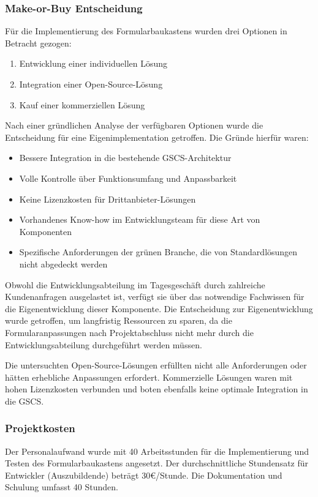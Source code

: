 \documentclass[a4paper,11pt]{article}
\begin{document}
\subsubsection{Make-or-Buy Entscheidung}
Für die Implementierung des Formularbaukastens wurden drei Optionen in Betracht gezogen:

\begin{enumerate}
  \item  Entwicklung einer individuellen Lösung
  \item Integration einer Open-Source-Lösung
  \item Kauf einer kommerziellen Lösung
\end{enumerate}

\noindent Nach einer gründlichen Analyse der verfügbaren Optionen wurde die Entscheidung für eine Eigenimplementation getroffen. Die Gründe hierfür waren:

\begin{itemize}
  \item Bessere Integration in die bestehende GSCS-Architektur
  \item Volle Kontrolle über Funktionsumfang und Anpassbarkeit
  \item Keine Lizenzkosten für Drittanbieter-Lösungen
  \item Vorhandenes Know-how im Entwicklungsteam für diese Art von Komponenten
  \item Spezifische Anforderungen der grünen Branche, die von Standardlösungen nicht abgedeckt werden
\end{itemize}

\noindent Obwohl die Entwicklungsabteilung im Tagesgeschäft durch zahlreiche Kundenanfragen ausgelastet ist, verfügt sie über das notwendige Fachwissen für die Eigenentwicklung dieser Komponente. Die Entscheidung zur Eigenentwicklung wurde getroffen, um langfristig Ressourcen zu sparen, da die Formularanpassungen nach Projektabschluss nicht mehr durch die Entwicklungsabteilung durchgeführt werden müssen.

\noindent Die untersuchten Open-Source-Lösungen erfüllten nicht alle Anforderungen oder hätten erhebliche Anpassungen erfordert. Kommerzielle Lösungen waren mit hohen Lizenzkosten verbunden und boten ebenfalls keine optimale Integration in die GSCS.

\subsubsection{Projektkosten}
\noindent Der Personalaufwand wurde mit 40 Arbeitsstunden für die Implementierung und Testen des Formularbaukastens angesetzt. Der durchschnittliche Stundensatz für Entwickler (Auszubildende) beträgt 30€/Stunde. Die Dokumentation und Schulung umfasst 40 Stunden.
\end{document}
